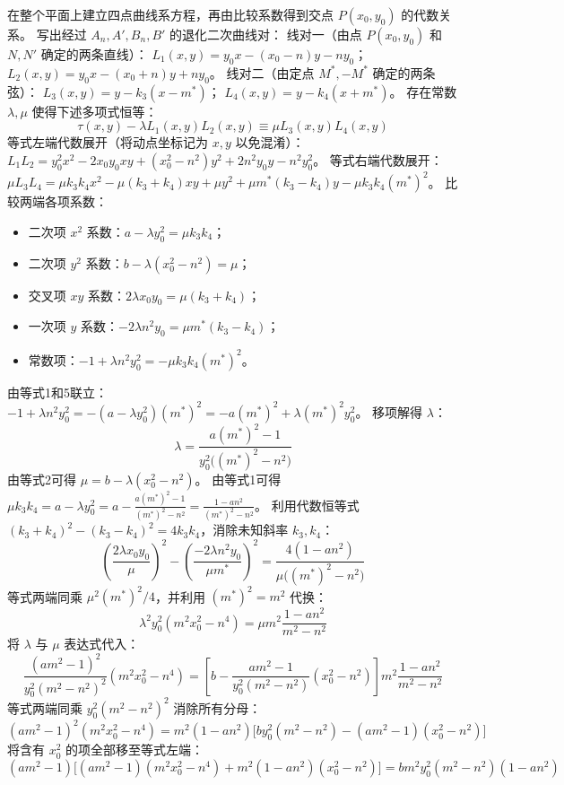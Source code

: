 \begin{solution}
在整个平面上建立四点曲线系方程，再由比较系数得到交点 $P(x_0, y_0)$ 的代数关系。
写出经过 $A_n, A', B_n, B'$ 的退化二次曲线对：
线对一（由点 $P(x_0, y_0)$ 和 $N, N'$ 确定的两条直线）：
$L_1(x, y) = y_0 x - (x_0-n) y - n y_0$；
$L_2(x, y) = y_0 x - (x_0+n) y + n y_0$。
线对二（由定点 $M^*, -M^*$ 确定的两条弦）：
$L_3(x, y) = y - k_3 (x - m^*)$；
$L_4(x, y) = y - k_4 (x + m^*)$。
存在常数 $\lambda, \mu$ 使得下述多项式恒等：
$$ \tau(x, y) - \lambda L_1(x, y) L_2(x, y) \equiv \mu L_3(x, y) L_4(x, y) $$
等式左端代数展开（将动点坐标记为 $x, y$ 以免混淆）：
$L_1 L_2 = y_0^2 x^2 - 2 x_0 y_0 x y + (x_0^2 - n^2) y^2 + 2 n^2 y_0 y - n^2 y_0^2$。
等式右端代数展开：
$\mu L_3 L_4 = \mu k_3 k_4 x^2 - \mu (k_3 + k_4) x y + \mu y^2 + \mu m^*(k_3 - k_4) y - \mu k_3 k_4 (m^*)^2$。
比较两端各项系数：
\begin{itemize}
\item 二次项 $x^2$ 系数：$a - \lambda y_0^2 = \mu k_3 k_4$；
\item 二次项 $y^2$ 系数：$b - \lambda (x_0^2 - n^2) = \mu$；
\item 交叉项 $x y$ 系数：$2 \lambda x_0 y_0 = \mu (k_3 + k_4)$；
\item 一次项 $y$ 系数：$-2 \lambda n^2 y_0 = \mu m^* (k_3 - k_4)$；
\item 常数项：$-1 + \lambda n^2 y_0^2 = -\mu k_3 k_4 (m^*)^2$。
\end{itemize}
由等式1和5联立：
$-1 + \lambda n^2 y_0^2 = -(a - \lambda y_0^2) (m^*)^2 = -a (m^*)^2 + \lambda (m^*)^2 y_0^2$。
移项解得 $\lambda$：
$$ \lambda = \frac{a (m^*)^2 - 1}{y_0^2 \big((m^*)^2 - n^2\big)} $$
由等式2可得 $\mu = b - \lambda (x_0^2 - n^2)$。
由等式1可得 $\mu k_3 k_4 = a - \lambda y_0^2 = a - \frac{a (m^*)^2 - 1}{(m^*)^2 - n^2} = \frac{1 - a n^2}{(m^*)^2 - n^2}$。
利用代数恒等式 $(k_3 + k_4)^2 - (k_3 - k_4)^2 = 4 k_3 k_4$，消除未知斜率 $k_3, k_4$：
$$ \left( \frac{2 \lambda x_0 y_0}{\mu} \right)^2 - \left( \frac{-2 \lambda n^2 y_0}{\mu m^*} \right)^2 = \frac{4(1 - a n^2)}{\mu \big((m^*)^2 - n^2\big)} $$
等式两端同乘 $\mu^2 (m^*)^2 / 4$，并利用 $(m^*)^2 = m^2$ 代换：
$$ \lambda^2 y_0^2 (m^2 x_0^2 - n^4) = \mu m^2 \frac{1 - a n^2}{m^2 - n^2} $$
将 $\lambda$ 与 $\mu$ 表达式代入：
$$ \frac{(a m^2 - 1)^2}{y_0^2 (m^2 - n^2)^2} (m^2 x_0^2 - n^4) = \left[ b - \frac{a m^2 - 1}{y_0^2 (m^2 - n^2)} (x_0^2 - n^2) \right] m^2 \frac{1 - a n^2}{m^2 - n^2} $$
等式两端同乘 $y_0^2 (m^2 - n^2)^2$ 消除所有分母：
$$ (a m^2 - 1)^2 (m^2 x_0^2 - n^4) = m^2 (1 - a n^2) \big[ b y_0^2 (m^2 - n^2) - (a m^2 - 1)(x_0^2 - n^2) \big] $$
将含有 $x_0^2$ 的项全部移至等式左端：
$$ (a m^2 - 1) \big[ (a m^2 - 1)(m^2 x_0^2 - n^4) + m^2 (1 - a n^2)(x_0^2 - n^2) \big] = b m^2 y_0^2 (m^2 - n^2) (1 - a n^2) $$

\end{solution}
